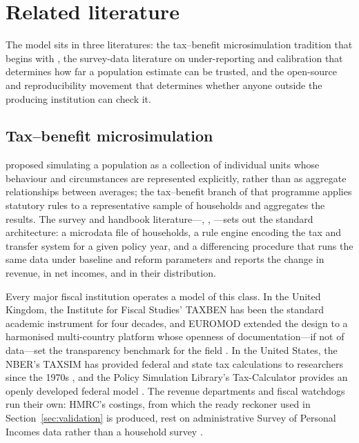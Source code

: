 \section{Related literature}
\label{sec:literature}

The model sits in three literatures: the tax--benefit microsimulation tradition that begins with \citet{orcutt1957}, the survey-data literature on under-reporting and calibration that determines how far a population estimate can be trusted, and the open-source and reproducibility movement that determines whether anyone outside the producing institution can check it.

\subsection{Tax--benefit microsimulation}

\citet{orcutt1957} proposed simulating a population as a collection of individual units whose behaviour and circumstances are represented explicitly, rather than as aggregate relationships between averages; the tax--benefit branch of that programme applies statutory rules to a representative sample of households and aggregates the results. The survey and handbook literature---\citet{mitton2000}, \citet{bourguignon2006}, \citet{figari2015}---sets out the standard architecture: a microdata file of households, a rule engine encoding the tax and transfer system for a given policy year, and a differencing procedure that runs the same data under baseline and reform parameters and reports the change in revenue, in net incomes, and in their distribution.

Every major fiscal institution operates a model of this class. In the United Kingdom, the Institute for Fiscal Studies' TAXBEN has been the standard academic instrument for four decades, and EUROMOD extended the design to a harmonised multi-country platform whose openness of documentation---if not of data---set the transparency benchmark for the field \citep{sutherland2013}. In the United States, the NBER's TAXSIM has provided federal and state tax calculations to researchers since the 1970s \citep{feenberg1993}, and the Policy Simulation Library's Tax-Calculator provides an openly developed federal model \citep{taxcalculator}. The revenue departments and fiscal watchdogs run their own: HMRC's costings, from which the ready reckoner used in Section~\ref{sec:validation} is produced, rest on administrative Survey of Personal Incomes data rather than a household survey \citep{hmrc2025reckoner}.

